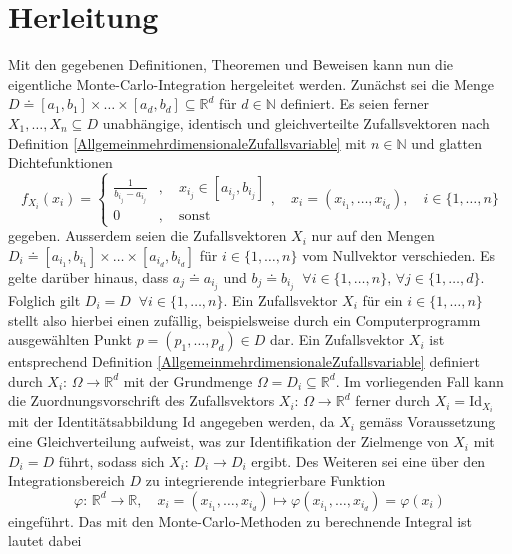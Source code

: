 \documentclass[a4paper,12pt]{article}
\begin{document}
\section{Herleitung}
Mit den gegebenen Definitionen, Theoremen und Beweisen kann nun die eigentliche Monte-Carlo-Integration hergeleitet werden. Zunächst sei die Menge $D \doteq [a_1,b_1]\times \dots \times [a_d,b_d] \subseteq \mathbb{R}^d$ für $d \in \mathbb{N}$ definiert. Es seien ferner $X_1,\dots,X_n \subseteq D$ unabhängige, identisch und gleichverteilte Zufallsvektoren nach Definition \ref{AllgemeinmehrdimensionaleZufallsvariable} mit $n \in \mathbb{N}$ und glatten Dichtefunktionen \begin{equation}
	f_{X_i}(x_i) = \begin{cases}
		\frac{1}{b_{i_j}-a_{i_j}}&,\quad x_{i_j} \in [a_{i_j},b_{i_j}] \\ 0&,\quad \mathrm{sonst}
	\end{cases}, \quad x_i = (x_{i_1},\dots,x_{i_d}), \quad i \in \{1,\dots,n\}
\end{equation} gegeben. Ausserdem seien die Zufallsvektoren $X_i$ nur auf den Mengen $D_i \doteq [a_{i_1},b_{i_1}]\times \dots \times [a_{i_d},b_{i_d}]$ für $i \in \{1,\dots,n\}$ vom Nullvektor verschieden. Es gelte darüber hinaus, dass $a_j \doteq a_{i_j}$ und $b_j \doteq b_{i_j} \;\;\forall i \in \{1,\dots,n\},\,\forall j \in \{1,\dots,d\}.$ Folglich gilt $D_i = D \;\;\forall i \in \{1,\dots,n\}.$ Ein Zufallsvektor $X_i$ für ein $i \in \{1,\dots,n\}$ stellt also hierbei einen zufällig, beispielsweise durch ein Computerprogramm ausgewählten Punkt $p = (p_1,\dots,p_d) \in D$ dar. Ein Zufallsvektor $X_i$ ist entsprechend Definition \ref{AllgemeinmehrdimensionaleZufallsvariable} definiert durch $X_i:\, \Omega \rightarrow \mathbb{R}^d$ mit der Grundmenge $\Omega = D_i \subseteq \mathbb{R}^d.$ Im vorliegenden Fall kann die Zuordnungsvorschrift des Zufallsvektors $X_i:\,\Omega \rightarrow \mathbb{R}^d$ ferner durch $X_i = \mathrm{Id}_{X_i}$ mit der Identitätsabbildung $\mathrm{Id}$ angegeben werden, da $X_i$ gemäss Voraussetzung eine Gleichverteilung aufweist, was zur Identifikation der Zielmenge von $X_i$ mit $D_i = D$ führt, sodass sich $X_i:\,D_i \rightarrow D_i$ ergibt. Des Weiteren sei eine über den Integrationsbereich $D$ zu integrierende integrierbare Funktion \begin{equation}
	\varphi :\,\mathbb{R}^d \rightarrow \mathbb{R},\quad x_i = (x_{i_1},\dots,x_{i_d}) \mapsto \varphi(x_{i_1},\dots,x_{i_d}) = \varphi(x_i)
\end{equation} eingeführt. Das mit den Monte-Carlo-Methoden zu berechnende Integral ist lautet dabei \begin{equation}\label{tocalcintegral}

\end{equation}
\end{document}
